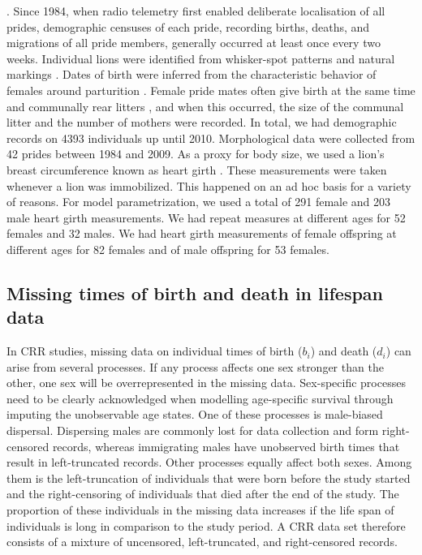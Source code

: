\citep{Mosser:2009fl, Packer:2005dr}.  Since 1984, when radio telemetry first enabled deliberate localisation of all prides, demographic censuses of each pride, recording births, deaths, and migrations of all pride members, generally occurred at least once every two weeks. Individual lions were identified from whisker-spot patterns and natural markings \citep{Packer:1991us}.  Dates of birth were inferred from the characteristic behavior of females around parturition \citep{Packer:2001wn}. Female pride mates often give birth at the same time and communally rear litters \citep{Packer:1988ux}, and when this occurred, the size of the communal litter and the number of mothers were recorded. In total, we had demographic records on 4393 individuals up until 2010. Morphological data were collected  from 42 prides between 1984 and 2009.  As a proxy for body size, we used a lion's breast circumference known as heart girth \citep{Bertram:1975voa}. These measurements were taken whenever a lion was immobilized. This happened on an ad hoc basis for a variety of reasons. For model parametrization, we used a total of 291 female and 203 male heart girth measurements. We had repeat measures at different ages for 52 females and 32 males. We had heart girth measurements of female offspring at different ages for 82 females and of male offspring for 53 females. 
\subsection{Missing times of birth and death in lifespan data}
In CRR studies, missing data on individual times of birth ($b_i$) and death ($d_i$) can arise from several processes. If any process affects one sex stronger than the other, one sex will be overrepresented in the missing data. Sex-specific processes need to be clearly acknowledged when modelling age-specific survival through imputing the unobservable age states. One of these processes is male-biased dispersal. Dispersing males are commonly lost for data collection and form right-censored records, whereas immigrating males have unobserved birth times that result in left-truncated records. Other processes equally affect both sexes. Among them is the left-truncation of individuals that were born before the study started and the right-censoring of individuals that died after the end of the study. The proportion of these individuals in the missing data increases if the life span of individuals is long in comparison to the study period. A CRR data set therefore consists of a mixture of uncensored, left-truncated, and right-censored records.


